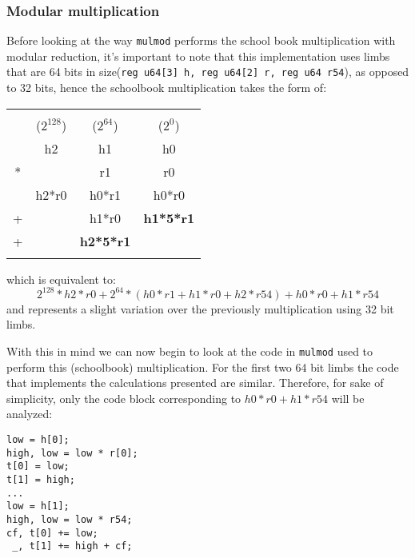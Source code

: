 \documentclass[twocolumn]{article}
\begin{document}
\subsubsection{Modular multiplication}
Before looking at the way \texttt{mulmod} performs the school book multiplication with modular reduction, it's important to note that this implementation uses 
limbs that are 64 bits in size(\texttt{reg u64[3] h, reg u64[2] r, reg u64 r54}), as opposed to 32 bits, hence the schoolbook multiplication takes the form of:

\begin{tabular}{cccc}
    &           &                   &                   \\
    &($2^{128}$)& ($2^{64}$)        & ($2^{0}$)         \\
    & h2        & h1                & h0                \\
*   &           & r1                & r0                \\
\hline
    & h2*r0     & h0*r1             & h0*r0             \\ 
+   &           & h1*r0             & \textbf{h1*5*r1}  \\
+   &           & \textbf{h2*5*r1}  &                   \\
    &           &                   &                   \\
\end{tabular}

which is equivalent to:
$$ 2^{128}*h2*r0 + 2^{64}*(h0*r1+h1*r0+h2*r54) + h0*r0+h1*r54 $$
and represents a slight variation over the previously multiplication using 32 bit limbs.

With this in mind we can now begin to look at the code in \texttt{mulmod} used to perform this (schoolbook) multiplication. For the first two 64 bit limbs 
the code that implements the calculations presented are similar. Therefore, for sake of simplicity, only the code block corresponding to $h0*r0+h1*r54$ will 
be analyzed:

\begin{verbatim}
low = h[0];
high, low = low * r[0];
t[0] = low;
t[1] = high;
...
low = h[1];
high, low = low * r54;
cf, t[0] += low;
 _, t[1] += high + cf;
\end{verbatim}
\end{document}
